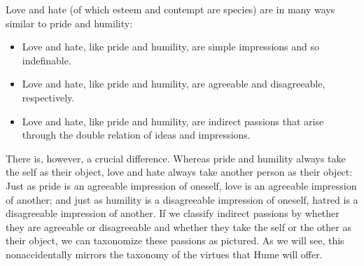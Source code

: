 % 


Love and hate (of which esteem and contempt are species) are in many ways similar to pride and humility:

\begin{itemize}
    \item Love and hate, like pride and humility, are simple impressions and so indefinable.
    \item Love and hate, like pride and humility, are agreeable and disagreeable, respectively.
    \item Love and hate, like pride and humility, are indirect passions that arise through the double relation of ideas and impressions.
\end{itemize}

There is, however, a crucial difference. Whereas pride and humility always take the self as their object, love and hate always take another person as their object: Just as pride is an agreeable impression of oneself, love is an agreeable impression of another; and just as humility is a disagreeable impression of oneself, hatred is a disagreeable impression of another. If we classify indirect passions by whether they are agreeable or disagreeable and whether they take the self or the other as their object, we can taxonomize these passions as pictured. As we will see, this nonaccidentally mirrors the taxonomy of the virtues that Hume will offer. \change


